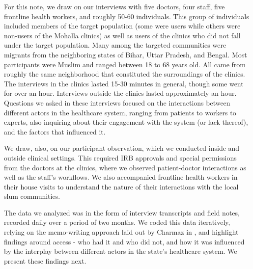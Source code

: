 For this note, we draw on our interviews with five doctors, four staff, five frontline health workers, and roughly 50-60 individuals. This group of individuals included members of the target population (some were users while others were non-users of the Mohalla clinics) as well as users of the clinics who did not fall under the target population. Many among the targeted communities were migrants from the neighboring states of Bihar, Uttar Pradesh, and Bengal. Most participants were Muslim and ranged between 18 to 68 years old. All came from roughly the same neighborhood that constituted the surroundings of the clinics. The interviews in the clinics lasted 15-30 minutes in general, though some went for over an hour. Interviews outside the clinics lasted approximately an hour. Questions we asked in these interviews focused on the interactions between different actors in the healthcare system, ranging from patients to workers to experts, also inquiring about their engagement with the system (or lack thereof), and the factors that influenced it. 

We draw, also, on our participant observation, which we conducted inside and outside clinical settings. This required IRB approvals and special permissions from the doctors at the clinics, where we observed patient-doctor interactions as well as the staff's workflows. We also accompanied frontline health workers in their house visits to understand the nature of their interactions with the local slum communities.

The data we analyzed was in the form of interview transcripts and field notes, recorded daily over a period of two months. We coded this data iteratively, relying on the memo-writing approach laid out by Charmaz in \cite{}, and highlight findings around access - who had it and who did not, and how it was influenced by the interplay between different actors in the state's healthcare system. We present these findings next. 
